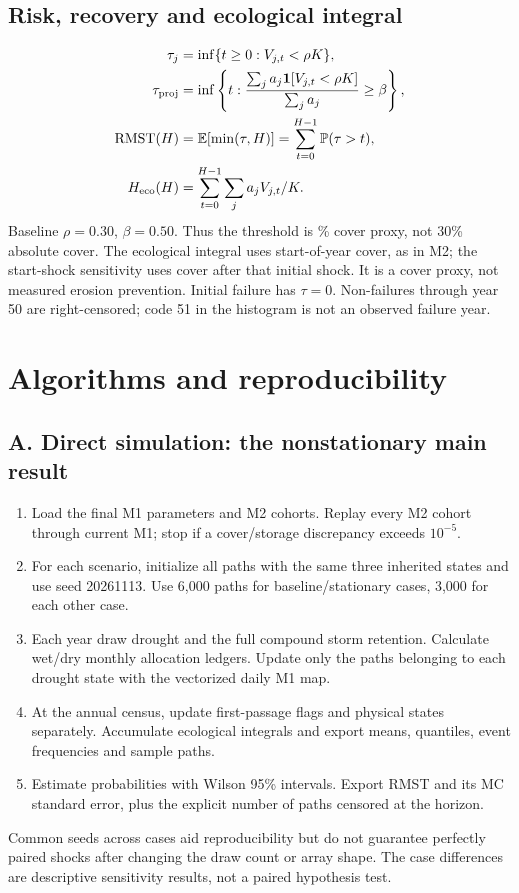 \documentclass[11pt,a4paper]{article}
\newcommand{\E}{\mathbb E}
\newcommand{\Prb}{\mathbb P}
\begin{document}
\subsection*{Risk, recovery and ecological integral}
\begin{align}
\tau_j&=\inf\{t\ge0:V_{j,t}<\rho K\},\\
\tau_{\rm proj}&=\inf\left\{t:\frac{\sum_j a_j\mathbf1[V_{j,t}<\rho K]}{\sum_j a_j}\ge\beta\right\},\\
\operatorname{RMST}(H)&=\E[\min(\tau,H)]=\sum_{t=0}^{H-1}\Prb(\tau>t),\\
H_{\rm eco}(H)&=\sum_{t=0}^{H-1}\sum_j a_jV_{j,t}/K.
\end{align}
Baseline $\rho=0.30$, $\beta=0.50$. Thus the threshold is \Threshold\% cover proxy, not 30\% absolute cover.
The ecological integral uses start-of-year cover, as in M2; the start-shock sensitivity uses cover after
that initial shock. It is a cover proxy, not measured erosion prevention. Initial failure has $\tau=0$.
Non-failures through year 50 are right-censored; code 51 in the histogram is not an observed failure year.

\clearpage
\section{Algorithms and reproducibility}
\subsection*{A. Direct simulation: the nonstationary main result}
\begin{enumerate}
\item Load the final M1 parameters and M2 cohorts. Replay every M2 cohort through current M1;
stop if a cover/storage discrepancy exceeds $10^{-5}$.
\item For each scenario, initialize all paths with the same three inherited states and use seed 20261113.
Use 6,000 paths for baseline/stationary cases, 3,000 for each other case.
\item Each year draw drought and the full compound storm retention. Calculate wet/dry monthly allocation
ledgers. Update only the paths belonging to each drought state with the vectorized daily M1 map.
\item At the annual census, update first-passage flags and physical states separately.
Accumulate ecological integrals and export means, quantiles, event frequencies and sample paths.
\item Estimate probabilities with Wilson 95\% intervals. Export RMST and its MC standard error,
plus the explicit number of paths censored at the horizon.
\end{enumerate}
Common seeds across cases aid reproducibility but do not guarantee perfectly paired shocks after
changing the draw count or array shape. The case differences are descriptive sensitivity results,
not a paired hypothesis test.
\end{document}
